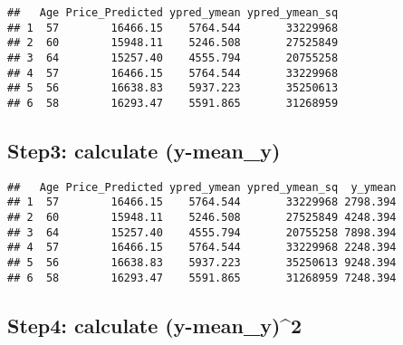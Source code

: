 \documentclass[]{article}
\newenvironment{Shaded}{\begin{snugshade}}{\end{snugshade}}
\newcommand{\DataTypeTok}[1]{\textcolor[rgb]{0.13,0.29,0.53}{#1}}
\newcommand{\DecValTok}[1]{\textcolor[rgb]{0.00,0.00,0.81}{#1}}
\newcommand{\KeywordTok}[1]{\textcolor[rgb]{0.13,0.29,0.53}{\textbf{#1}}}
\newcommand{\NormalTok}[1]{#1}
\newcommand{\OperatorTok}[1]{\textcolor[rgb]{0.81,0.36,0.00}{\textbf{#1}}}
\newcommand{\StringTok}[1]{\textcolor[rgb]{0.31,0.60,0.02}{#1}}
\begin{document}
\begin{verbatim}
##   Age Price_Predicted ypred_ymean ypred_ymean_sq
## 1  57        16466.15    5764.544       33229968
## 2  60        15948.11    5246.508       27525849
## 3  64        15257.40    4555.794       20755258
## 4  57        16466.15    5764.544       33229968
## 5  56        16638.83    5937.223       35250613
## 6  58        16293.47    5591.865       31268959
\end{verbatim}

\hypertarget{step3-calculate-y-mean_y}{%
\subsection{Step3: calculate
(y-mean\_y)}\label{step3-calculate-y-mean_y}}

\begin{Shaded}
\end{Shaded}

\begin{verbatim}
##   Age Price_Predicted ypred_ymean ypred_ymean_sq  y_ymean
## 1  57        16466.15    5764.544       33229968 2798.394
## 2  60        15948.11    5246.508       27525849 4248.394
## 3  64        15257.40    4555.794       20755258 7898.394
## 4  57        16466.15    5764.544       33229968 2248.394
## 5  56        16638.83    5937.223       35250613 9248.394
## 6  58        16293.47    5591.865       31268959 7248.394
\end{verbatim}

\hypertarget{step4-calculate-y-mean_y2}{%
\subsection{Step4: calculate
(y-mean\_y)\^{}2}\label{step4-calculate-y-mean_y2}}

\begin{Shaded}
\end{Shaded}
\end{document}
